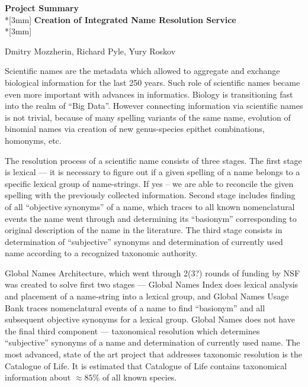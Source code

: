 \documentclass{proposal}
\begin{document}
\begin{center}
{\Large{\bf Project Summary}}\\*[3mm]
{\bf Creation of Integrated Name Resolution Service} \\*[3mm]

Dmitry Mozzherin, Richard Pyle, Yury Roskov \\


\end{center}

Scientific names are the metadata which allowed to aggregate and exchange
biological information for the last 250 years. Such role of scientific names
became even more important with advances in informatics. Biology is
transitioning fast into the realm of ``Big Data''. However connecting
information via scientific names is not trivial, because of many spelling
variants of the same name, evolution of binomial names via creation of new
genus-species epithet combinations, homonyms, etc.


The resolution process of a scientific name consists of three stages. The
first stage is lexical --- it is necessary to figure out if a given spelling of
a name belongs to a specific lexical group of name-strings. If yes -- we are
able to reconcile the given spelling with the previously collected information.
Second stage includes finding of all ``objective synonyms'' of a name, which
traces to all known nomenclatural events the name went through and determining
its ``basionym'' corresponding to original description of the name in the
literature. The third stage consists in determination of ``subjective''
synonyms and determination of currently used name according to a recognized
taxonomic authority.

Global Names Architecture, which went through 2(3?) rounds of funding by NSF
was created to solve first two stages --- Global Names Index does lexical
analysis and placement of a name-string into a lexical group, and Global Names
Usage Bank traces nomenclatural events of a name to find ``basionym'' and all
subsequent objective synonyms for a lexical group. Global Names does not
have the final third component --- taxonomical resolution which determines
``subjective'' synonyms of a name and determination of currently used name. The
most advanced, state of the art project that addresses taxonomic resolution is
the Catalogue of Life. It is estimated that Catalogue of Life contains
taxonomical information about $\approx85\%$ of all known species.
\end{document}
